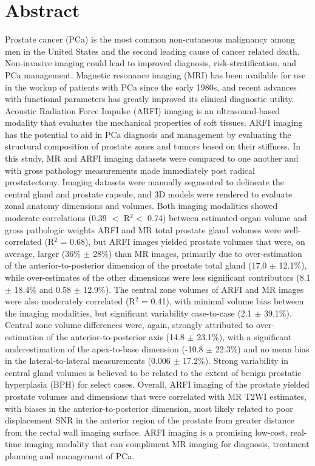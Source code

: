 \section*{Abstract}
Prostate cancer (PCa) is the most common non-cutaneous malignancy among men in
the United States and the second leading cause of cancer related death.
Non-invasive imaging could lead to improved diagnosis, risk-stratification, and
PCa management.  Magnetic resonance imaging (MRI) has been available for use in
the workup of patients with PCa since the early 1980s, and recent advances with
functional parameters has greatly improved its clinical diagnostic utility.
Acoustic Radiation Force Impulse (ARFI) imaging is an ultrasound-based modality
that evaluates the mechanical properties of soft tissues. ARFI imaging has the
potential to aid in PCa diagnosis and management by evaluating the structural
composition of prostate zones and tumors based on their stiffness.  In this
study, MR and ARFI imaging datasets were compared to one another and with gross
pathology measurements made immediately post radical prostatectomy.  Imaging
datasets were manually segmented to delineate the central gland and prostate
capsule, and 3D models were rendered to evaluate zonal anatomy dimensions and
volumes.  Both imaging modalities showed moderate correlations (0.39 $<$ R$^2 <
$ 0.74) between estimated organ volume and gross pathologic weights ARFI and MR
total prostate gland volumes were well-correlated (R$^2$ = 0.68), but ARFI
images yielded prostate volumes that were, on average, larger (36\% $\pm$ 28\%)
than MR images, primarily due to over-estimation of the anterior-to-posterior
dimension of the prostate total gland (17.0 $\pm$ 12.1\%), while over-estimates
of the other dimensions were less significant contributors (8.1 $\pm$ 18.4\%
and 0.58 $\pm$ 12.9\%).  The central zone volumes of ARFI and MR images were
also moderately correlated (R$^2$ = 0.41), with minimal volume bias between the
imaging modalities, but significant variability case-to-case (2.1 $\pm$
39.1\%).  Central zone volume differences were, again, strongly attributed to
over-estimation of the anterior-to-posterior axis (14.8 $\pm$ 23.1\%), with a
significant underestimation of the apex-to-base dimension (-10.8 $\pm$ 22.3\%)
and no mean bias in the lateral-to-lateral measurements (0.006 $\pm$ 17.2\%).
Strong variability in central gland volumes is believed to be related to the
extent of benign prostatic hyperplasia (BPH) for select cases.  Overall, ARFI
imaging of the prostate yielded prostate volumes and dimensions that were
correlated with MR T2WI estimates, with biases in the anterior-to-posterior
dimension, most likely related to poor displacement SNR in the anterior region
of the prostate from greater distance from the rectal wall imaging surface.
ARFI imaging is a promising low-cost, real-time imaging modality that can
compliment MR imaging for diagnosis, treatment planning and management of PCa.
